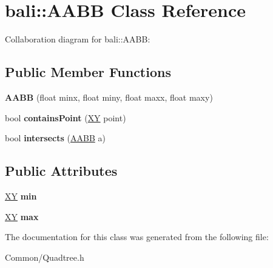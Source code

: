 \hypertarget{classbali_1_1_a_a_b_b}{\section{bali\-:\-:A\-A\-B\-B Class Reference}
\label{classbali_1_1_a_a_b_b}
}


Collaboration diagram for bali\-:\-:A\-A\-B\-B\-:
\subsection*{Public Member Functions}
\begin{DoxyCompactItemize}
\item 
\hypertarget{classbali_1_1_a_a_b_b_a1c7265708608302f9c7dcbfb2f1e9629}{{\bfseries A\-A\-B\-B} (float minx, float miny, float maxx, float maxy)}\label{classbali_1_1_a_a_b_b_a1c7265708608302f9c7dcbfb2f1e9629}

\item 
\hypertarget{classbali_1_1_a_a_b_b_a24234a07febd47775e8d9eb1eea364c2}{bool {\bfseries contains\-Point} (\hyperlink{classbali_1_1_x_y}{X\-Y} point)}\label{classbali_1_1_a_a_b_b_a24234a07febd47775e8d9eb1eea364c2}

\item 
\hypertarget{classbali_1_1_a_a_b_b_aa28922834723a5b34e3f6f4e3859b51f}{bool {\bfseries intersects} (\hyperlink{classbali_1_1_a_a_b_b}{A\-A\-B\-B} a)}\label{classbali_1_1_a_a_b_b_aa28922834723a5b34e3f6f4e3859b51f}

\end{DoxyCompactItemize}
\subsection*{Public Attributes}
\begin{DoxyCompactItemize}
\item 
\hypertarget{classbali_1_1_a_a_b_b_a191f6d1b17b88e8b5f05b854b8332168}{\hyperlink{classbali_1_1_x_y}{X\-Y} {\bfseries min}}\label{classbali_1_1_a_a_b_b_a191f6d1b17b88e8b5f05b854b8332168}

\item 
\hypertarget{classbali_1_1_a_a_b_b_a33f911a72a3ee994665e072a3849ff7e}{\hyperlink{classbali_1_1_x_y}{X\-Y} {\bfseries max}}\label{classbali_1_1_a_a_b_b_a33f911a72a3ee994665e072a3849ff7e}

\end{DoxyCompactItemize}


The documentation for this class was generated from the following file\-:\begin{DoxyCompactItemize}
\item 
Common/Quadtree.\-h\end{DoxyCompactItemize}
